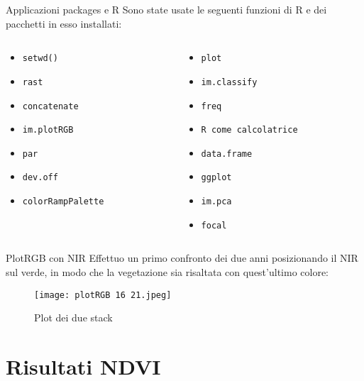 \documentclass{beamer} %
\begin{document}
        \begin{frame}{Applicazioni packages e R}
        Sono state usate le seguenti funzioni di R e dei pacchetti in esso installati:
        \bigskip
\begin{columns}
\begin{column}{0.5\textwidth}
\begin{itemize}
    \item    \texttt{setwd()} 
    \item    \texttt{rast} 
    \item    \texttt{concatenate} 
    \item    \texttt{im.plotRGB}
    \item    \texttt{par}
    \item    \texttt{dev.off}
    \item    \texttt{colorRampPalette}
\end{itemize}
\end{column}
\begin{column}{0.5\textwidth}  
 \begin{itemize}
    \item    \texttt{plot}
    \item    \texttt{im.classify}
    \item    \texttt{freq}
    \item    \texttt{R come calcolatrice}
    \item    \texttt{data.frame}
    \item    \texttt{ggplot}
    \item    \texttt{im.pca}
    \item    \texttt{focal}
    \end{itemize}
\end{column}
\end{columns}
\end{frame}
        
        \begin{frame}{PlotRGB con NIR}
Effettuo un primo confronto dei due anni posizionando il NIR sul verde, in modo che la vegetazione sia risaltata con quest'ultimo colore:
\begin{figure}
        \centering
        \texttt{[image: plotRGB 16 21.jpeg]}
        \caption{Plot dei due stack}
    \end{figure}

\end{frame}
        


\section{Risultati NDVI}
\end{document}

